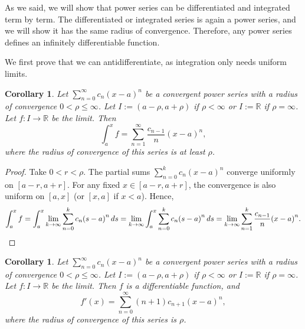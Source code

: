 \documentclass[12pt]{book}
\newcommand{\R}{{\mathbb{R}}}
\theoremstyle{plain}
\newtheorem{cor}[thm]{Corollary}
\theoremstyle{remark}
\theoremstyle{definition}
\theoremstyle{exercise}
\theoremstyle{example}
\begin{document}
As we said, we will show that
power series can be differentiated and integrated
term by term.  The 
differentiated or integrated series is again a power series,
and we will show it has the same radius of convergence.
Therefore, 
any power series defines an infinitely differentiable function.

We first prove that we can antidifferentiate, as integration only needs
uniform limits.

\begin{cor}
Let $\sum_{n=0}^\infty c_n {(x-a)}^n$ be a convergent power series with a radius
of convergence $0 < \rho \leq \infty$.
Let $I := (a-\rho,a+\rho)$ if $\rho < \infty$
or $I := \R$ if $\rho= \infty$.  Let $f \colon I \to \R$ be the limit.
Then
\begin{equation*}
\int_a^x f = \sum_{n=1}^\infty \frac{c_{n-1}}{n} {(x-a)}^{n} ,
\end{equation*}
where the radius of convergence of this series is at least $\rho$.
\end{cor}

\begin{proof}
Take $0 < r < \rho$.
The partial sums $\sum_{n=0}^k c_n {(x-a)}^n$ converge uniformly on $[a-r,a+r]$.
For any fixed $x \in [a-r,a+r]$, the convergence is also uniform
on $[a,x]$ (or $[x,a]$ if $x < a$).
Hence,
\begin{equation*}
\int_a^x f =
\int_a^x \lim_{k\to\infty} \sum_{n=0}^k c_n {(s-a)}^n \, ds
=
\lim_{k\to\infty}
\int_a^x \sum_{n=0}^k c_n {(s-a)}^n \, ds
=
\lim_{k\to\infty}
\sum_{n=1}^k \frac{c_{n-1}}{n} {(x-a)}^{n} . \qedhere
\end{equation*}
\end{proof}


\begin{cor}
Let $\sum_{n=0}^\infty c_n {(x-a)}^n$ be a convergent power series with a radius
of convergence $0 < \rho \leq \infty$.
Let $I := (a-\rho,a+\rho)$ if $\rho < \infty$
or $I := \R$ if $\rho= \infty$.  Let $f \colon I \to \R$ be the limit.
Then $f$ is a differentiable function, and
\begin{equation*}
f'(x) = \sum_{n=0}^\infty (n+1) c_{n+1} {(x-a)}^{n} ,
\end{equation*}
where the radius of convergence of this series is $\rho$.
\end{cor}
\end{document}
